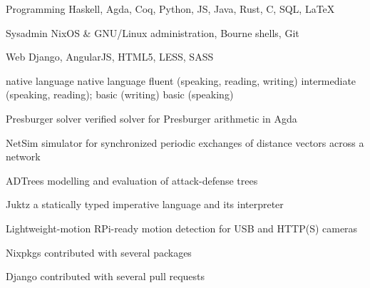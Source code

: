 \documentclass[11pt, a4paper]{awesome-cv}
\begin{document}
\noindent
\begin{minipage}[t]{0.55\linewidth}
\vspace{0.21\baselineskip}
\begin{cvskills}
    \cvskill
      {Programming} %
      {Haskell, Agda, Coq, Python, JS, Java, Rust, C, SQL, LaTeX} %
  
    \cvskill
      {Sysadmin} %
      {NixOS \& GNU/Linux administration, Bourne shells, Git} %
  
    \cvskill
      {Web} %
      {Django, AngularJS, HTML5, LESS, SASS} %
\end{cvskills}
\end{minipage}%
\hspace{0.05\linewidth}
\begin{minipage}[t]{0.4\linewidth}
\begin{cvskills}
     {native language}
     {native language}
     {fluent (speaking, reading, writing)}
     {
        intermediate (speaking, reading);\newline
        basic (writing)}
     {basic (speaking)}
\end{cvskills}
\end{minipage}


\begin{cvskills}
    \cvskill
        {Presburger solver}
        {verified solver for Presburger arithmetic in Agda}

    \cvskill
        {NetSim}
        {simulator for synchronized periodic exchanges of distance vectors
        across a network}

    \cvskill
        {ADTrees}
        {modelling and evaluation of attack-defense trees}

    \cvskill
        {Juktz}
        {a statically typed imperative language and its interpreter}

    \cvskill
        {Lightweight-motion}
        {RPi-ready motion detection for USB and HTTP(S) cameras}

    \cvskill
        {Nixpkgs}
        {contributed with several packages}

    \cvskill
        {Django}
        {contributed with several pull requests}
\end{cvskills}

\end{document}
